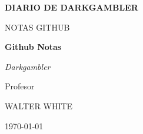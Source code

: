 \begin{titlepage}
	\centering
	
	{\scshape\LARGE \textbf{DIARIO DE DARKGAMBLER} \par}
	\vspace{1cm}
	{\scshape\Large NOTAS GITHUB\par}
	\vspace{1.5cm}
	{\huge\bfseries \textcolor{azulSection}{Github Notas}\par}
	\vspace{2cm}
	       {\Large\itshape Darkgambler\par}
	\vfill
	Profesor\par
	WALTER WHITE

	\vfill

	{\large \today\par}
\end{titlepage}
